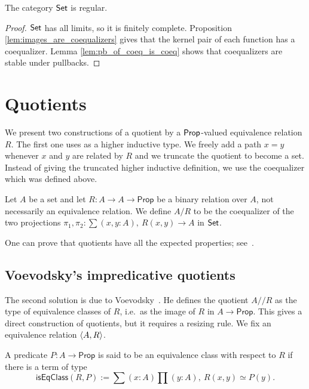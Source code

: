 \begin{thm}\label{thm:set_regular}
The category $\mathsf{Set}$ is regular.
\end{thm}

\begin{proof}
$\mathsf{Set}$ has all limits, so it is finitely complete. 
Proposition \ref{lem:images_are_coequalizers} gives
that the kernel pair of each function has a coequalizer.
Lemma \ref{lem:pb_of_coeq_is_coeq} shows that
coequalizers are stable under pullbacks.
\end{proof}


\section{Quotients}
\label{sec:quotients}


We present two constructions of a quotient by a $\mathsf{Prop}$-valued equivalence relation $R$. 
The first one uses as a higher inductive type. We freely add a path $x= y$ whenever $x$ 
and $y$ are related by $R$ and we truncate the quotient to become a set.
Instead of giving the truncated higher inductive definition, we use the coequalizer which was defined above.

\begin{defn}
Let $A$ be a set and let $R:A\to A\to\mathsf{Prop}$ be a binary relation over
$A$, not necessarily an equivalence relation. 
We define $A/R$ to be the coequalizer of the two projections
$\pi_1,\pi_2:\sum(x,y:A),\ R(x,y)\to A$ in $\mathsf{Set}$.
\end{defn} 

One can prove that quotients have all the expected properties; see~\cite{RijkeSpitters}.

\subsection{Voevodsky's impredicative quotients}\label{sec:resizing}
The second solution is due to Voevodsky~\cite{pelayo2013preliminary}.
He defines the quotient $A/\!\!/R $ as the type of equivalence classes of $R$, 
i.e.\ as the image of $R$ in $A\to\mathsf{Prop}$. This gives a direct
construction of quotients, but it requires a resizing rule. We fix an equivalence relation ${\langle A,R\rangle}$.

\begin{defn}
A predicate $P:A\to\mathsf{Prop}$ is said to be an equivalence class with 
respect to $R $ if there is a term of type
\begin{equation*}
\mathsf{isEqClass}(R ,P):=\sum(x:A)\prod(y:A),\ R (x,y)\simeq P(y).
\end{equation*}
\end{defn}

